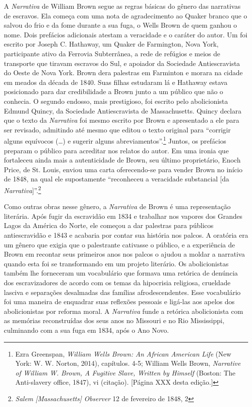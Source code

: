 A \emph{Narrativa} de William Brown segue as regras básicas do gênero
das narrativas de escravos. Ela começa com uma nota de agradecimento ao
Quaker branco que o salvou do frio e da fome durante a sua fuga, o Wells
Brown de quem ganhou o nome. Dois prefácios adicionais atestam a
veracidade e o caráter do autor. Um foi escrito por Joseph C. Hathaway,
um Quaker de Farmington, Nova York, participante ativo da Ferrovia
Subterrânea, a rede de refúgios e meios de transporte que tiravam
escravos do Sul, e apoiador da Sociedade Antiescravista do Oeste de Nova
York. Brown dera palestras em Farminton e morara na cidade em meados da
década de 1840. Suas filhas estudaram lá e Hathaway estava posicionado
para dar credibilidade a Brown junto a um público que não o conhecia. O
segundo endosso, mais prestigioso, foi escrito pelo abolicionista Edmund
Quincy, da Sociedade Antiescravista de Massachusetts. Quincy declara que
o texto da \emph{Narrativa} foi mesmo escrito por Brown e apresentado a
ele para ser revisado, admitindo até mesmo que editou o texto original
para ``corrigir alguns equívocos (\ldots{}) e sugerir alguns
abreviamentos''.\footnote{Ezra Greenspan, \emph{William Wells Brown: An
  African American Life} (New York: W. W. Norton, 2014), capítulos. 4-5;
  William Wells Brown, \emph{Narrative of William W. Brown, A Fugitive
  Slave, Written by Himself} (Boston: The Anti-slavery office, 1847), vi
  (citação). {[}Página XXX desta edição.{]}} Juntos, os prefácios
preparam o público para acreditar nos relatos do autor. Em uma ironia
que fortaleceu ainda mais a autenticidade de Brown, seu último
proprietário, Enoch Price, de St. Louis, enviou uma carta oferecendo-se
para vender Brown no início de 1848, na qual ele supostamente
``reconheceu a veracidade substancial {[}da
\emph{Narrativa}{]}''.\footnote{\emph{Salem {[}Massachusetts{]}
  Observer} 12 de fevereiro de 1848, 2}

Como outras obras nesse gênero, a \emph{Narrativa} de Brown é uma
representação literária. Após fugir da escravidão em 1834 e trabalhar
nos vapores dos Grandes Lagos da América do Norte, ele começou a dar
palestras para públicos antiescravidão e 1843 e acabaria por contar sua
história nos palcos. A oratória era um gênero que exigia que o
palestrante cativasse o público, e a experiência de Brown em recontar
seus primeiros anos nos palcos o ajudou a moldar a narrativa quando esta
foi se transformando em um projeto literário. Os abolicionistas também
lhe forneceram um vocabulário que formava uma retórica de denúncia dos
escravizadores de acordo com os temas da hipocrisia religiosa, crueldade
lasciva e separações desalmadas das famílias afrodescendentes. Esse
vocabulário foi uma maneira de enquadrar suas reflexões pessoais e
ligá-las aos apelos dos abolicionistas por reforma moral. A
\emph{Narrativa} funde a retórica abolicionista com as memórias
reconstruídas dos seus anos no Missouri e no Rio Mississippi, culminando
com a sua fuga em 1834, após o Ano Novo.


